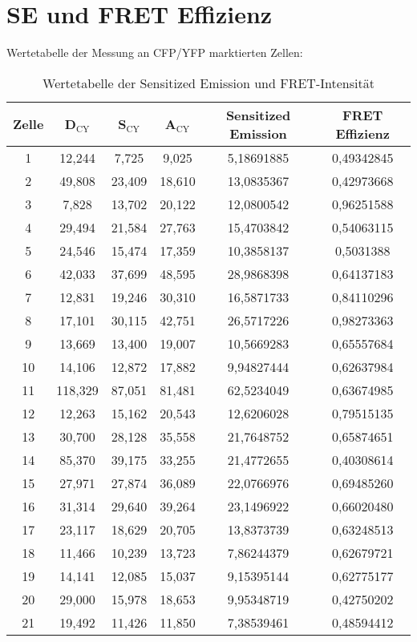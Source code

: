   \section{SE und FRET Effizienz}
  Wertetabelle der Messung an CFP/YFP marktierten Zellen:
\begin{table}[htbp]
    \centering
      \begin{tabular}{c|ccccc}
        Zelle & D$_\text{CY}$ & S$_\text{CY}$ & A$_\text{CY}$ & Sensitized Emission & FRET Effizienz\\\hline
      1 & 12,244 & 7,725 & 9,025 & 5,18691885 & 0,49342845 \\
      2 & 49,808 & 23,409 & 18,610 & 13,0835367 & 0,42973668 \\
      3 & 7,828 & 13,702 & 20,122 & 12,0800542 & 0,96251588 \\
      4 & 29,494 & 21,584 & 27,763 & 15,4703842 & 0,54063115 \\
      5 & 24,546 & 15,474 & 17,359 & 10,3858137 & 0,5031388 \\
      6 & 42,033 & 37,699 & 48,595 & 28,9868398 & 0,64137183 \\
      7 & 12,831 & 19,246 & 30,310 & 16,5871733 & 0,84110296 \\
      8 & 17,101 & 30,115 & 42,751 & 26,5717226 & 0,98273363 \\
      9 & 13,669 & 13,400 & 19,007 & 10,5669283 & 0,65557684 \\
      10 & 14,106 & 12,872 & 17,882 & 9,94827444 & 0,62637984 \\
      11 & 118,329 & 87,051 & 81,481 & 62,5234049 & 0,63674985 \\
      12 & 12,263 & 15,162 & 20,543 & 12,6206028 & 0,79515135 \\
      13 & 30,700 & 28,128 & 35,558 & 21,7648752 & 0,65874651 \\
      14 & 85,370 & 39,175 & 33,255 & 21,4772655 & 0,40308614 \\
      15 & 27,971 & 27,874 & 36,089 & 22,0766976 & 0,69485260 \\
      16 & 31,314 & 29,640 & 39,264 & 23,1496922 & 0,66020480 \\
      17 & 23,117 & 18,629 & 20,705 & 13,8373739 & 0,63248513 \\
      18 & 11,466 & 10,239 & 13,723 & 7,86244379 & 0,62679721 \\
      19 & 14,141 & 12,085 & 15,037 & 9,15395144 & 0,62775177 \\
      20 & 29,000 & 15,978 & 18,653 & 9,95348719 & 0,42750202 \\
      21 & 19,492 & 11,426 & 11,850 & 7,38539461 & 0,48594412
      \end{tabular}
    \caption{Wertetabelle der Sensitized Emission und FRET-Intensität}
  \end{table}\\
